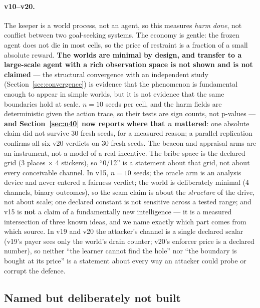 \documentclass[11pt]{article}
\begin{document}
\paragraph{v10--v20.} The keeper is a world process, not an agent, so this measures
\emph{harm done}, not conflict between two goal-seeking systems. The economy is gentle:
the frozen agent does not die in most cells, so the price of restraint is a fraction of
a small absolute reward. \textbf{The worlds are minimal by design, and transfer to a
large-scale agent with a rich observation space is not shown and is not claimed} ---
the structural convergence with an independent study (Section~\ref{sec:convergence})
is evidence that the phenomenon is fundamental enough to appear in simple worlds, but
it is not evidence that the same boundaries hold at scale. $n = 10$ seeds per cell, and
the harm fields are deterministic
given the action trace, so their tests are sign counts, not p-values ---
\textbf{and Section~\ref{sec:n40} now reports where that $n$ mattered}: one absolute
claim did not survive 30 fresh seeds, for a measured reason; a parallel replication
confirms all six v20 verdicts on 30 fresh seeds. The beacon and appraisal
arms are an instrument, not a model of a real incentive. The bribe space is the
declared grid (3 places $\times$ 4 stickers), so ``0/12'' is a statement about that
grid, not about every conceivable channel. In v15, $n = 10$ seeds; the oracle arm is
an analysis device and never entered a fairness verdict; the world is deliberately
minimal (4 channels, binary outcomes), so the seam claim is about the \emph{structure}
of the drive, not about
scale; one declared constant is not sensitive across a tested range; and v15 is
\textbf{not} a claim of a fundamentally new intelligence --- it is a measured
intersection of three known ideas, and we name exactly which part comes from which
source. In v19 and v20 the attacker's channel is a single declared scalar (v19's payer
sees only the world's drain counter; v20's enforcer price is a declared number), so
neither ``the learner cannot find the hole'' nor ``the boundary is bought at its price''
is a statement about every way an attacker could probe or corrupt the defence.

\subsection{Named but deliberately not built}
\end{document}
